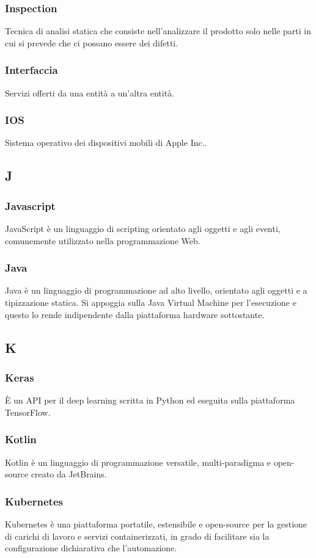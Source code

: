 \subsubsection*{Inspection} Tecnica di analisi statica che consiste nell’analizzare il prodotto solo nelle parti in cui si prevede che ci possano essere dei difetti.
\subsubsection*{Interfaccia} Servizi offerti da una entità a un'altra entità.
\subsubsection*{IOS} Sistema operativo dei dispositivi mobili di Apple Inc..
\subsection*{J}
\subsubsection*{Javascript} JavaScript è un linguaggio di scripting orientato agli oggetti e agli eventi, comunemente utilizzato nella programmazione Web.
\subsubsection*{Java} Java è un linguaggio di programmazione ad alto livello, orientato agli oggetti e a tipizzazione statica. Si appoggia sulla Java Virtual Machine per l'esecuzione e questo lo rende indipendente dalla piattaforma hardware sottostante.
\subsection*{K}
\subsubsection*{Keras} È un API per il deep learning scritta in Python ed eseguita sulla piattaforma TensorFlow.
\subsubsection*{Kotlin} Kotlin è un linguaggio di programmazione versatile, multi-paradigma e open-source creato da JetBrains.
\subsubsection*{Kubernetes} Kubernetes è una piattaforma portatile, estensibile e open-source per la gestione di carichi di lavoro e servizi containerizzati, in grado di facilitare sia la configurazione dichiarativa che l'automazione.
